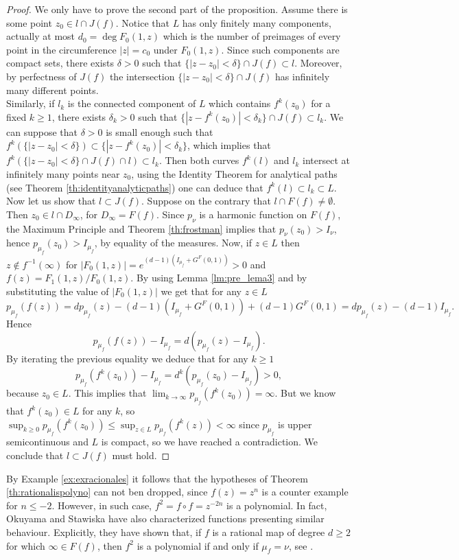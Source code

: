 \begin{proof}
We only have to prove the second part of the proposition. Assume there is some point $z_0\in l\cap J(f)$. Notice that $L$ has only finitely many components, actually at most $d_0=\deg F_0(1,z)$ which is the number of preimages of every point in the circumference $|z|=c_0$ under $F_0(1,z)$. Since such components are compact sets, there exists $\delta>0$ such that $\{|z-z_0|<\delta\}\cap J(f)\subset l$. Moreover, by perfectness of $J(f)$ the intersection $\{|z-z_0|<\delta\}\cap J(f)$ has infinitely many different points.\\

Similarly, if $l_k$ is the connected component of $L$ which contains $f^k(z_0)$ for a fixed $k\geq 1$, there exists $\delta_k>0$ such that $\{|z-f^k(z_0)|<\delta_k\}\cap J(f)\subset l_k$. We can suppose that $\delta>0$ is small enough such that $f^k(\{|z-z_0|<\delta\}) \subset \{|z-f^k(z_0)|<\delta_k\}$, which implies that $f^k(\{|z-z_0|<\delta\}\cap J(f)\cap l) \subset l_k$. Then both curves $f^k(l)$ and $l_k$ intersect at infinitely many points near $z_0$, using the Identity Theorem for analytical paths (see Theorem \ref{th:identityanalyticpaths}) one can deduce that $f^k(l) \subset l_k\subset L$.\\

Now let us show that $l\subset J(f)$. Suppose on the contrary that $l\cap F(f)\neq \emptyset$. Then $z_0\in l\cap D_\infty$, for $D_\infty=F(f)$. Since $p_\nu$ is a harmonic function on $F(f)$, the Maximum Principle  and Theorem \ref{th:frostman} implies that $p_\nu(z_0)>I_\nu$, hence $p_{\mu_f}(z_0)>I_{\mu_f}$, by equality of the measures. Now, if $z\in L$ then $z\not \in f^{-1}(\infty)$ for $|F_0(1,z)|=e^{(d-1)(I_{\mu_f} + G^F(0,1))}> 0$ and $f(z) =F_1(1,z)/F_0(1,z)$. By using Lemma \ref{lm:pre_lema3} and by substituting the value of $|F_0(1,z)|$ we get that for any $z\in L$
$$p_{\mu_f}(f(z)) = dp_{\mu_f}(z)-(d-1)(I_{\mu_f}+G^F(0,1)) + (d-1)G^F(0,1) = d p_{\mu_f}(z)-(d-1)I_{\mu_f}.$$ 
Hence
$$p_{\mu_f}(f(z)) - I_{\mu_f} = d(p_{\mu_f}(z)-I_{\mu_f}).$$
By iterating the previous equality we deduce that for any $k\geq 1$
$$ p_{\mu_f}(f^k(z_0)) - I_{\mu_f} = d^k(p_{\mu_f}(z_0)-I_{\mu_f})>0,$$
because $z_0\in L$. This implies that $\lim_{k \rightarrow \infty} p_{\mu_f}(f^k(z_0))=\infty$. But we know that $f^k(z_0)\in L$ for any $k$, so $\sup_{k\geq 0} p_{\mu_f}(f^k(z_0)) \leq \sup_{z\in L} p_{\mu_f}(f^k(z))<\infty$ since $p_{\mu_f}$ is upper semicontinuous and $L$ is compact, so we have reached a contradiction. We conclude that $l\subset J(f)$ must hold.
\end{proof}

\begin{myrmk}{}{}
By Example \ref{ex:exracionales} it follows that the hypotheses of Theorem \ref{th:rationalispolyno} can not ben dropped, since $f(z) = z^n$ is a counter example for $n\leq -2$. However, in such case, $f^2 = f\circ f = z^{-2n}$ is a polynomial. In fact, Okuyama and Stawiska have also characterized functions presenting similar behaviour. Explicitly, they have shown that, if $f$ is a rational map of degree $d\geq 2$ for which $\infty\in F(f)$, then $f^2$ is a polynomial if and only if $\mu_f = \nu$, see \cite[Theorem 1]{okuyama2018}.
\end{myrmk}